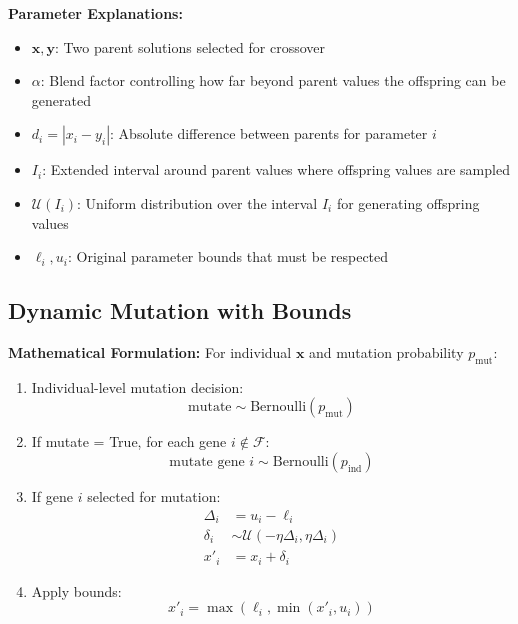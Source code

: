 \documentclass[12pt,a4paper]{article}
\begin{document}
\textbf{Parameter Explanations:}
\begin{itemize}
\item $\bm{x}, \bm{y}$: Two parent solutions selected for crossover
\item $\alpha$: Blend factor controlling how far beyond parent values the offspring can be generated
\item $d_i = |x_i - y_i|$: Absolute difference between parents for parameter $i$
\item $I_i$: Extended interval around parent values where offspring values are sampled
\item $\mathcal{U}(I_i)$: Uniform distribution over the interval $I_i$ for generating offspring values
\item $\ell_i, u_i$: Original parameter bounds that must be respected
\end{itemize}

\subsection{Dynamic Mutation with Bounds}
\textbf{Mathematical Formulation:}
For individual $\bm{x}$ and mutation probability $p_{\text{mut}}$:

\begin{enumerate}
\item Individual-level mutation decision:
\begin{equation}
\text{mutate} \sim \text{Bernoulli}(p_{\text{mut}}) \label{eq:mutation_decision}
\end{equation}

\item If mutate = True, for each gene $i \notin \mathcal{F}$:
\begin{equation}
\text{mutate gene } i \sim \text{Bernoulli}(p_{\text{ind}}) \label{eq:gene_mutation_decision}
\end{equation}

\item If gene $i$ selected for mutation:
\begin{align}
\Delta_i &= u_i - \ell_i \label{eq:parameter_range} \\
\delta_i &\sim \mathcal{U}(-\eta \Delta_i, \eta \Delta_i) \label{eq:mutation_perturbation} \\
x'_i &= x_i + \delta_i \label{eq:mutation_application}
\end{align}

\item Apply bounds:
\begin{equation}
x'_i = \max(\ell_i, \min(x'_i, u_i)) \label{eq:mutation_bounds}
\end{equation}
\end{enumerate}
\end{document}
